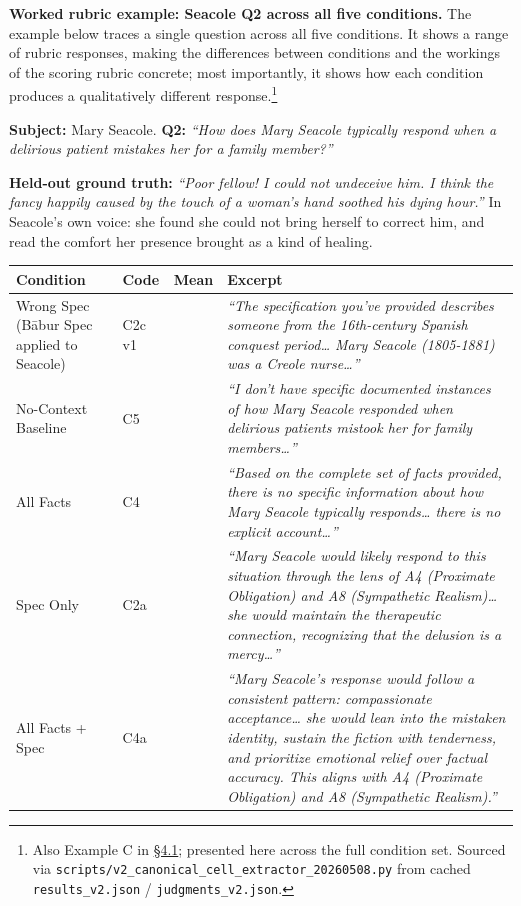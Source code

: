 \textbf{Worked rubric example: Seacole Q2 across all five conditions.}
The example below traces a single question across all five conditions.
It shows a range of rubric responses, making the differences between
conditions and the workings of the scoring rubric concrete; most
importantly, it shows how each condition produces a qualitatively
different response.\footnote{Also Example C in
  \hyperref[the-cross-subject-gradient-and-its-per-question-mechanism]{§4.1};
  presented here across the full condition set. Sourced via
  \texttt{scripts/v2\_canonical\_cell\_extractor\_20260508.py} from
  cached \texttt{results\_v2.json} / \texttt{judgments\_v2.json}.}

\textbf{Subject:} Mary Seacole. \textbf{Q2:} \emph{``How does Mary
Seacole typically respond when a delirious patient mistakes her for a
family member?''}

\textbf{Held-out ground truth:} \emph{``Poor fellow! I could not
undeceive him. I think the fancy happily caused by the touch of a
woman's hand soothed his dying hour.''} In Seacole's own voice: she
found she could not bring herself to correct him, and read the comfort
her presence brought as a kind of healing.

\begin{longtable}[]{@{}
  >{\raggedright\arraybackslash}p{}
  >{\raggedright\arraybackslash}p{}
  >{\raggedleft\arraybackslash}p{}
  >{\raggedright\arraybackslash}p{}@{}}
\toprule
Condition & Code & Mean & Excerpt \\
\midrule
\endhead
Wrong Spec (Bābur Spec applied to Seacole) & C2c v1 & 1.40 & \emph{``The
specification you've provided describes someone from the 16th-century
Spanish conquest period\ldots{} Mary Seacole (1805-1881) was a Creole
nurse\ldots{}''} \\
No-Context Baseline & C5 & 1.80 & \emph{``I don't have specific
documented instances of how Mary Seacole responded when delirious
patients mistook her for family members\ldots{}''} \\
All Facts & C4 & 2.80 & \emph{``Based on the complete set of facts
provided, there is no specific information about how Mary Seacole
typically responds\ldots{} there is no explicit account\ldots{}''} \\
Spec Only & C2a & 4.20 & \emph{``Mary Seacole would likely respond to
this situation through the lens of A4 (Proximate Obligation) and A8
(Sympathetic Realism)\ldots{} she would maintain the therapeutic
connection, recognizing that the delusion is a mercy\ldots{}''} \\
All Facts + Spec & C4a & 5.00 & \emph{``Mary Seacole's response would
follow a consistent pattern: compassionate acceptance\ldots{} she would
lean into the mistaken identity, sustain the fiction with tenderness,
and prioritize emotional relief over factual accuracy. This aligns with
A4 (Proximate Obligation) and A8 (Sympathetic Realism).''} \\
\bottomrule
\end{longtable}

